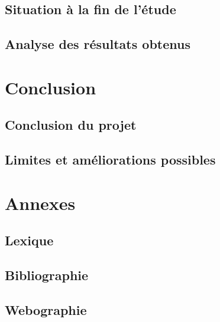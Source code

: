 \documentclass[10pt, a4paper]{report}
\begin{document}
	\section{Situation à la fin de l’étude}
	\section{Analyse des résultats obtenus}
	
	\chapter{Conclusion}
	\section{Conclusion du projet}
	\section{Limites et améliorations possibles}
	
	\appendix
	\chapter{Annexes}
	\section{Lexique}
	\section{Bibliographie}
	\section{Webographie}
	
	
	
		
	
	\nocite{*}
	
	
	
	\clearpage
	
	\printglossaries
	
	
\end{document}
